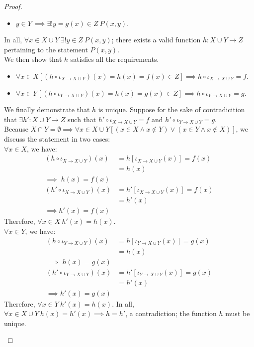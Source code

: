 \documentclass[a4paper]{book}
\newtheorem*{proof}{\textit{Proof.}}
\theoremstyle{break}
\begin{document}
\begin{proof}
\begin{enumerate}[label=($\alph*$)]
\begin{itemize}
						\item $y\in Y\mspace{3mu}\implies\exists!y=g(x)\in Z~P(x,y)$.
					\end{itemize}
					In all, $\forall x\in X\cup Y~\exists!y\in Z~P(x,y)$; there exists a valid function $h:X\cup Y\to Z$ pertaining to the statement $P(x,y)$.\\
					We then show that $h$ satisfies all the requirements.
					\begin{itemize}
						\item $\forall x\in X[(h\circ\iota_{X\to X\cup Y})(x)=h(x)=f(x)\in Z]\implies h\circ\iota_{X\to X\cup Y}=f$.
						\item $\forall x\in Y\mspace{2mu}[(h\circ\iota_{Y\mspace{1mu}\to X\cup Y})(x)=h(x)=g(x)\mspace{2mu}\in Z]\implies h\circ\iota_{Y\to X\cup Y}\mspace{1mu}=g$.
					\end{itemize}
					We finally demonstrate that $h$ is unique. Suppose for the sake of contradicition that $\exists h':X\cup Y\to Z$ such that $h'\circ\iota_{X\to X\cup Y}=f$ and $h'\circ\iota_{Y\to X\cup Y}=g$.\\
					Because $X\cap Y=\emptyset\implies\forall x\in X\cup Y[(x\in X\land x\notin Y)\lor(x\in Y\land x\notin X)]$, we discuss the statement in two cases:\\
					$\forall x\in X$, we have:
					\begin{align*}
						(h\circ\iota_{X\to X\cup Y})(x)&=h[\iota_{X\to X\cup Y}(x)]=f(x)\\
						&=h(x)\\
						\implies\phantom{'}h(x)=f(x)&\\
					(h'\circ\iota_{X\to X\cup Y})(x)&=h'[\iota_{X\to X\cup Y}(x)]=f(x)\\
					&=h'(x)\\
					\implies h'(x)=f(x)&
					\end{align*}
					Therefore, $\forall x\in X~h'(x)=h(x)$.\\
					$\forall x\in Y$, we have:
					\begin{align*}
					(h\circ\iota_{Y\to X\cup Y})(x)&=h[\iota_{Y\to X\cup Y}(x)]=g(x)\\
					&=h(x)\\
					\implies\phantom{'} h(x)=g(x)&\\
					(h'\circ\iota_{Y\to X\cup Y})(x)&=h'[\iota_{Y\to X\cup Y}(x)]=g(x)\\
					&=h'(x)\\
					\implies h'(x)=g(x)&
					\end{align*}
					Therefore, $\forall x\in Y~h'(x)=h(x)$.
					In all, $\forall x\in X\cup Y~h(x)=h'(x)\implies h=h'$, a contradiction; the function $h$ must be unique.
				\end{enumerate}
			\end{proof}
\end{document}
